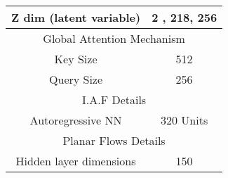 \begin{table}[]
\begin{tabular}{|c|c|}
		Z dim (latent variable)          & 2 , 218, 256        \\ \hline
		\multicolumn{2}{|c|}{Global Attention Mechanism}       \\ \hline
		Key Size                         & 512                 \\ \hline
		Query Size                       & 256                 \\ \hline
		\multicolumn{2}{|c|}{I.A.F Details}                    \\ \hline
		Autoregressive NN                & 320 Units           \\ \hline
		\multicolumn{2}{|c|}{Planar Flows Details}             \\ \hline
		Hidden layer dimensions          & 150                 \\ \hline
	\end{tabular}
\end{table}